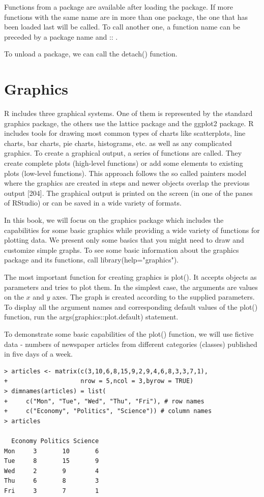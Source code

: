 \documentclass[11pt,openany,executivepaper]{book}
\begin{document}
Functions from a package are available after loading the package. If more functions with the same name are in more than one package, the one that has been loaded last will be called. To call another one, a function name can be preceded by a package name and :: .

To unload a package, we can call the detach() function.

\section{Graphics}
R includes three graphical systems. One of them is represented by the standard graphics package, the others use the lattice package and the ggplot2 package. R includes tools for drawing most common types of charts like scatterplots, line charts, bar charts, pie charts, histograms, etc. as well as any complicated graphics. To create a graphical output, a series of functions are called. They create complete plots (high-level functions) or add some elements to existing plots (low-level functions). This approach follows the so called painters model where the graphics are created in steps and newer objects overlap the previous output [204]. The graphical output is printed on the screen (in one of the panes of RStudio) or can be saved in a wide variety of formats.

In this book, we will focus on the graphics package which includes the capabilities for some basic graphics while providing a wide variety of functions for plotting data. We present only some basics that you might need to draw and customize simple graphs. To see some basic information about the graphics package and its functions, call library(help="graphics").

The most important function for creating graphics is plot(). It accepts objects as parameters and tries to plot them. In the simplest case, the arguments are values on the $x$ and $y$ axes. The graph is created according to the supplied parameters. To display all the argument names and corresponding default values of the plot() function, run the args(graphics::plot.default) statement.

To demonstrate some basic capabilities of the plot() function, we will use fictive data - numbers of newspaper articles from different categories (classes) published in five days of a week.

\begin{verbatim}
> articles <- matrix(c(3,10,6,8,15,9,2,9,4,6,8,3,3,7,1),
+                    nrow = 5,ncol = 3,byrow = TRUE)
> dimnames(articles) = list(
+     c("Mon", "Tue", "Wed", "Thu", "Fri"), # row names
+     c("Economy", "Politics", "Science")) # column names
> articles

  Economy Politics Science
Mon     3       10       6
Tue     8       15       9
Wed     2       9        4
Thu     6       8        3
Fri     3       7        1

\end{verbatim}
\end{document}

